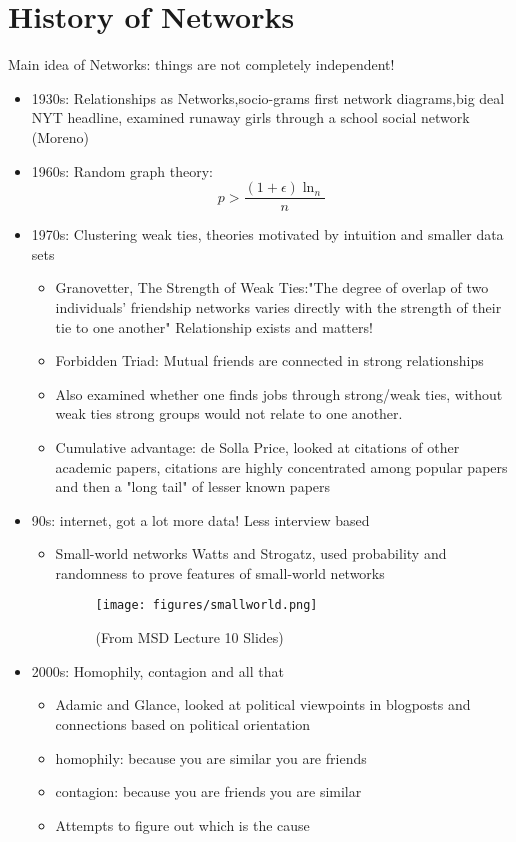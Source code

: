 \section{History of Networks}
Main idea of Networks: things are not completely independent! 
\begin{itemize}
  \item 1930s: Relationships as Networks,socio-grams first network diagrams,big deal NYT headline, examined runaway girls through a school social network (Moreno) 
  \item 1960s: Random graph theory:
  \begin{equation}
      p > \frac{(1+\epsilon)\ln_n }{n}
  \end{equation}
  \item 1970s: Clustering weak ties, theories motivated by intuition and smaller data sets 
  \begin{itemize}
  \item  Granovetter, The Strength of Weak Ties:"The degree of overlap of two individuals' friendship networks varies directly with the strength of their tie to one another"  Relationship exists and matters! 
  \item Forbidden Triad: Mutual friends are connected in strong relationships 
  \item Also examined whether one finds jobs through strong/weak ties, without weak ties strong groups would not relate to one another. 
   \item Cumulative advantage: de Solla Price, looked at citations of other academic papers, citations are highly concentrated among popular papers and then a "long tail" of lesser known papers  
  \end{itemize}
  \item 90s: internet, got a lot more data! Less interview based 
  \begin{itemize}
      \item  Small-world networks Watts and Strogatz, used probability and randomness to prove features of small-world networks 
      \clearpage
      \begin{figure}[ht]
  \begin{center}
    \texttt{[image: figures/smallworld.png]}
    \caption{(From MSD Lecture 10 Slides) 
     }
    \label{fig:example_figure}
  \end{center}
\end{figure}
  \end{itemize}
  \item 2000s: Homophily, contagion and all that
  \begin{itemize}
      \item Adamic and Glance, looked at political viewpoints in blogposts and connections based on political orientation
      \item homophily: because you are similar you are friends
      \item contagion: because you are friends you are similar 
      \item Attempts to figure out which is the cause 
  \end{itemize}
\end{itemize}
